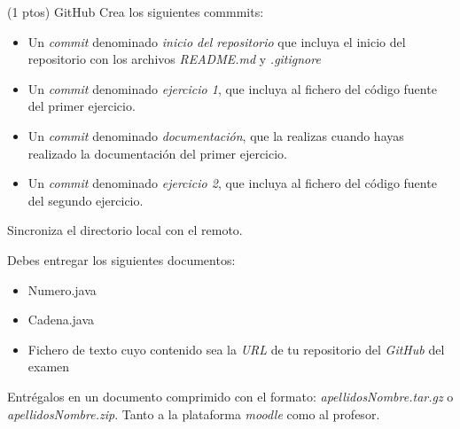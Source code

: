 \documentclass[addpoints,12pt]{exam}
\begin{document}
\begin{questions}
\vspace{0.5 cm}

\question (1 ptos) GitHub
Crea los siguientes commmits:
\begin{itemize}
\item Un \emph{commit} denominado \emph{inicio del repositorio} que incluya el inicio del repositorio con los archivos \emph{README.md} y \emph{.gitignore}
\item Un \emph{commit} denominado \emph{ejercicio 1}, que incluya al fichero del código fuente del primer ejercicio.
\item Un \emph{commit} denominado \emph{documentación}, que la realizas cuando hayas realizado la documentación del primer ejercicio.
\item Un \emph{commit} denominado \emph{ejercicio 2}, que incluya al fichero del código fuente del segundo ejercicio.
\end{itemize}
Sincroniza el directorio local con el remoto.

\end{questions}
\newpage
\vspace{0,5cm}
Debes entregar los siguientes documentos:
\begin{itemize}
\item Numero.java
\item Cadena.java
\item Fichero de texto cuyo contenido sea la \emph{URL} de tu repositorio del \emph{GitHub} del examen
\end{itemize}

Entrégalos en un documento comprimido con el formato:\emph{ apellidosNombre.tar.gz} o \emph{apellidosNombre.zip}. Tanto a la plataforma \emph{moodle} como al profesor.
\end{document}
